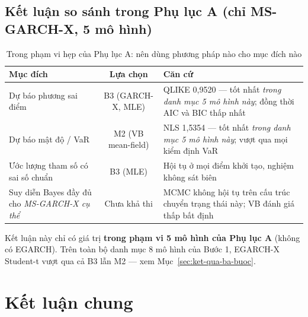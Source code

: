 \documentclass[11pt,a4paper]{article}
\begin{document}
\subsection{Kết luận so sánh trong Phụ lục A (chỉ MS-GARCH-X, 5 mô hình)}

\begin{table}[H]\centering
\caption{Trong phạm vi hẹp của Phụ lục A: nên dùng phương pháp nào cho mục đích nào}
\begin{threeparttable}
\begin{tabularx}{\textwidth}{L C L}
\toprule
\textbf{Mục đích} & \textbf{Lựa chọn} & \textbf{Căn cứ} \\
\midrule
Dự báo phương sai điểm & B3 (GARCH-X, MLE) & QLIKE 0{,}9520 --- tốt nhất \emph{trong danh mục 5 mô hình này}; đồng thời AIC và BIC thấp nhất \\
Dự báo mật độ / VaR & M2 (VB mean-field) & NLS 1{,}5354 --- tốt nhất \emph{trong danh mục 5 mô hình này}; vượt qua mọi kiểm định VaR \\
Ước lượng tham số có sai số chuẩn & B3 (MLE) & Hội tụ ở mọi điểm khởi tạo, nghiệm không sát biên \\
Suy diễn Bayes đầy đủ cho \emph{MS-GARCH-X cụ thể} & \textcolor{Warn}{Chưa khả thi} & MCMC không hội tụ trên cấu trúc chuyển trạng thái này; VB đánh giá thấp bất định \\
\bottomrule
\end{tabularx}
\begin{tablenotes}\small
\item Kết luận này chỉ có giá trị \textbf{trong phạm vi 5 mô hình của Phụ lục A} (không có EGARCH). Trên toàn bộ danh mục 8 mô hình của Bước 1, EGARCH-X Student-t vượt qua cả B3 lẫn M2 --- xem Mục~\ref{sec:ket-qua-ba-buoc}.
\end{tablenotes}
\end{threeparttable}
\end{table}


\section{Kết luận chung}
\end{document}
